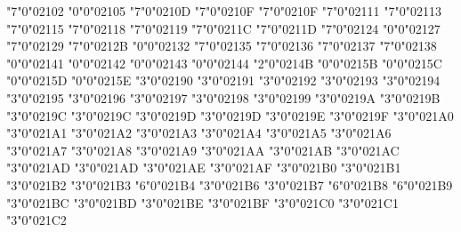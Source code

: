 \def\underleftarrow{\maccent"7"0"020EE }
\def\underrightarrow{\maccent"7"0"020EF }
\mchardef\complex"7"0"02102
\mchardef\incare"0"0"02105
\mchardef\hilbert"7"0"0210D
\mchardef\hslash"7"0"0210F
\let\hbar\hslash
\mchardef\hbar"7"0"0210F
\mchardef\Im"7"0"02111
\mchardef\ell"7"0"02113
\mchardef\posinteger"7"0"02115
\mchardef\wp"7"0"02118
\mchardef\REALP"7"0"02119
\mchardef\Re"7"0"0211C
\mchardef\REALR"7"0"0211D
\mchardef\ZED"7"0"02124
\mchardef\mho"0"0"02127
\mchardef\turnediota"7"0"02129
\mchardef\Angstrom"7"0"0212B
\mchardef\Finv"0"0"02132
\mchardef\aleph"7"0"02135
\mchardef\beth"7"0"02136
\mchardef\gimel"7"0"02137
\mchardef\daleth"7"0"02138
\mchardef\Game"0"0"02141
\mchardef\sansLmirrored"0"0"02142
\mchardef\sansLinverted"0"0"02143
\mchardef\Yup"0"0"02144
\mchardef\upand"2"0"0214B
\mchardef\fraconeeighth"0"0"0215B
\mchardef\fracthreeeighths"0"0"0215C
\mchardef\fracfiveeighths"0"0"0215D
\mchardef\fracseveneights"0"0"0215E
\mchardef\leftarrow"3"0"02190
\mchardef\uparrow"3"0"02191
\mchardef\rightarrow"3"0"02192
\mchardef\downarrow"3"0"02193
\mchardef\leftrightarrow"3"0"02194
\mchardef\updownarrow"3"0"02195
\mchardef\nwarrow"3"0"02196
\mchardef\nearrow"3"0"02197
\mchardef\searrow"3"0"02198
\mchardef\swarrow"3"0"02199
\mchardef\nleftarrow"3"0"0219A
\mchardef\nrightarrow"3"0"0219B
\mchardef\leftsquigarrow"3"0"0219C
\mchardef\leftwavyarrow"3"0"0219C
\mchardef\rightsquigarrow"3"0"0219D
\mchardef\rightwavyarrow"3"0"0219D
\mchardef\twoheadleftarrow"3"0"0219E
\mchardef\twoheaduparrow"3"0"0219F
\mchardef\twoheadrightarrow"3"0"021A0
\mchardef\twoheaddownarrow"3"0"021A1
\mchardef\leftarrowtail"3"0"021A2
\mchardef\rightarrowtail"3"0"021A3
\mchardef\mapsfrom"3"0"021A4
\mchardef\mapsup"3"0"021A5
\mchardef\mapsto"3"0"021A6
\mchardef\mapsdown"3"0"021A7
\mchardef\updownarrowbar"3"0"021A8
\mchardef\hookleftarrow"3"0"021A9
\mchardef\hookrightarrow"3"0"021AA
\mchardef\looparrowleft"3"0"021AB
\mchardef\looparrowright"3"0"021AC
\mchardef\leftrightsquigarrow"3"0"021AD
\mchardef\leftrightwavyarrow"3"0"021AD
\mchardef\nleftrightarrow"3"0"021AE
\mchardef\downzigzagarrow"3"0"021AF
\mchardef\Lsh"3"0"021B0
\mchardef\Rsh"3"0"021B1
\mchardef\Ldsh"3"0"021B2
\mchardef\Rdsh"3"0"021B3
\mchardef\linefeed"6"0"021B4
\mchardef\curvearrowleft"3"0"021B6
\mchardef\curvearrowright"3"0"021B7
\mchardef\barovernorthwestarrow"6"0"021B8
\mchardef\barleftarrowrightarrowbar"6"0"021B9
\mchardef\leftharpoonup"3"0"021BC
\mchardef\leftharpoondown"3"0"021BD
\mchardef\upharpoonright"3"0"021BE
\mchardef\upharpoonleft"3"0"021BF
\mchardef\rightharpoonup"3"0"021C0
\mchardef\rightharpoondown"3"0"021C1
\mchardef\downharpoonright"3"0"021C2
